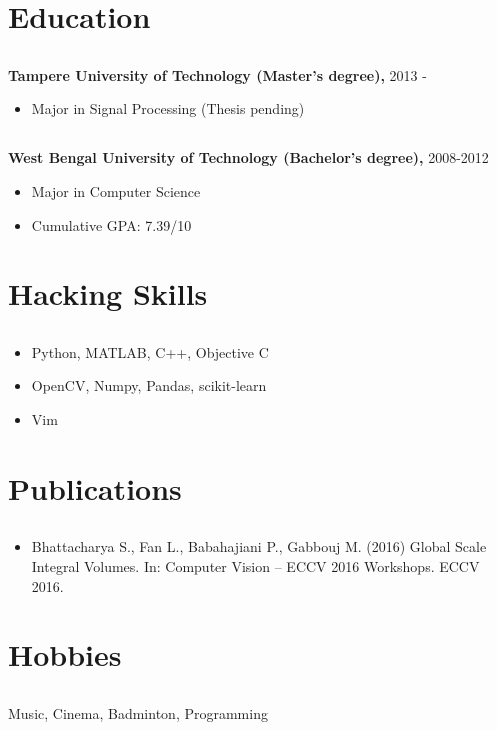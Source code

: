 \documentclass{article}
\begin{document}
\section{Education}
\subsection{}
\textbf{Tampere University of Technology (Master's degree),} 2013 - 
\begin{itemize}[label={--}]
  \itemsep0em 
  \item Major in Signal Processing (Thesis pending)
\end{itemize}

\subsection{}
\textbf{West Bengal University of Technology (Bachelor's degree),} 2008-2012
\begin{itemize}[label={--}]
  \itemsep0em 
  \item Major in Computer Science
  \item Cumulative GPA: 7.39/10
\end{itemize}

\section{Hacking Skills}
\subsection{}
\begin{itemize}[label={--}]
  \itemsep0em 
  \item Python, MATLAB, C++, Objective C
  \item OpenCV, Numpy, Pandas, scikit-learn
  \item Vim
\end{itemize}

\section{Publications}
\subsection{}
\begin{itemize}[label={--}]
  \itemsep0em 
  \item Bhattacharya S., Fan L., Babahajiani P., Gabbouj M. (2016) Global Scale
    Integral Volumes. In: Computer Vision – ECCV 2016 Workshops. ECCV 2016.
\end{itemize}

\section{Hobbies}
\subsection{}
Music, Cinema, Badminton, Programming
\end{document}
